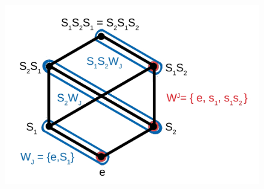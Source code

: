 \begin{figure}[h]
		\centering
		\includegraphics[scale=0.2]{Coxetergroupimagediamand.JPG}
\end{figure}

